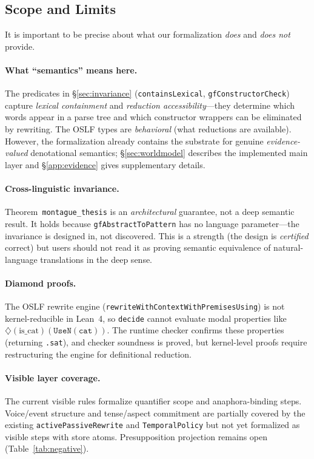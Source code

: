 \documentclass[11pt]{article}
\newcommand{\code}[1]{\texttt{#1}}
\newcommand{\Dia}{\ensuremath{\diamondsuit}}
\newcommand{\OSLF}{\textup{OSLF}}
\begin{document}
\subsection{Scope and Limits}

It is important to be precise about what our formalization \emph{does} and
\emph{does not} provide.

\paragraph{What ``semantics'' means here.}  The predicates in
\S\ref{sec:invariance} (\code{containsLexical}, \code{gfConstructorCheck})
capture \emph{lexical containment} and \emph{reduction accessibility}---they
determine which words appear in a parse tree and which constructor
wrappers can be eliminated by rewriting.  The \OSLF{} types are
\emph{behavioral} (what reductions are available).  However, the
formalization already contains the substrate for genuine
\emph{evidence-valued} denotational semantics; \S\ref{sec:worldmodel}
describes the implemented main layer and \S\ref{app:evidence} gives
supplementary details.

\paragraph{Cross-linguistic invariance.}  Theorem~\code{montague\_thesis}
is an \emph{architectural} guarantee, not a deep semantic result.  It
holds because \code{gfAbstractToPattern} has no language parameter---the
invariance is designed in, not discovered.  This is a strength (the design
is \emph{certified} correct) but users should not read it as proving
semantic equivalence of natural-language translations in the deep sense.

\paragraph{Diamond proofs.}  The \OSLF{} rewrite engine
(\code{rewriteWithContextWithPremisesUsing}) is not kernel-reducible in
Lean~4, so \code{decide} cannot evaluate modal properties like
$\Dia(\text{is\_cat})(\code{UseN}(\code{cat}))$.  The runtime checker
confirms these properties (returning \code{.sat}), and checker soundness is
proved, but kernel-level proofs require restructuring the engine for
definitional reduction.

\paragraph{Visible layer coverage.}  The current visible rules formalize
quantifier scope and anaphora-binding steps.  Voice/event structure and
tense/aspect commitment are partially covered by the
existing \code{activePassiveRewrite} and \code{TemporalPolicy} but not
yet formalized as visible steps with store atoms.  Presupposition
projection remains open (Table~\ref{tab:negative}).
\end{document}
